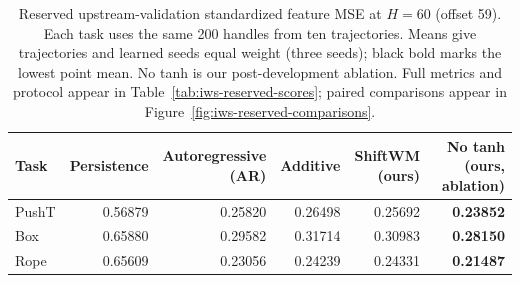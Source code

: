 \begin{table}[t]\centering
\caption{Reserved upstream-validation standardized feature MSE at $H=60$ (offset 59). Each task uses the same 200 handles from ten trajectories. Means give trajectories and learned seeds equal weight (three seeds); black bold marks the lowest point mean. No tanh is our post-development ablation. Full metrics and protocol appear in Table~\ref{tab:iws-reserved-scores}; paired comparisons appear in Figure~\ref{fig:iws-reserved-comparisons}.}
\label{tab:iws-reserved-main-scores}
\begingroup\fontsize{9}{10.8}\selectfont\setlength{\tabcolsep}{4pt}\renewcommand{\arraystretch}{1.15}
\begin{tabular}{@{}lrrrrr@{}}\toprule Task & Persistence & \shortstack{Autoregressive\\(AR)} & Additive & \shortstack{ShiftWM\\(ours)} & \shortstack{No tanh\\(ours, ablation)} \\ \midrule
PushT & 0.56879 & 0.25820 & 0.26498 & 0.25692 & \textbf{0.23852} \\
Box & 0.65880 & 0.29582 & 0.31714 & 0.30983 & \textbf{0.28150} \\
Rope & 0.65609 & 0.23056 & 0.24239 & 0.24331 & \textbf{0.21487} \\
\bottomrule\end{tabular}\endgroup\end{table}
